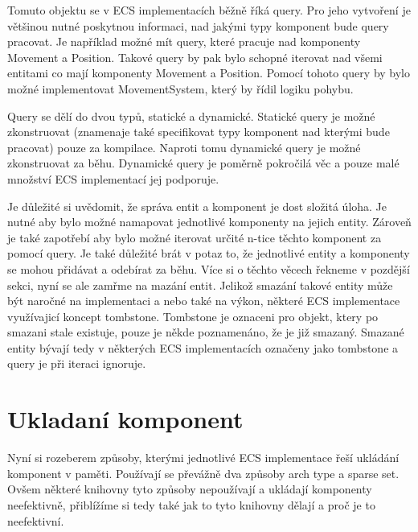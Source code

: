 Tomuto objektu se v ECS implementacích běžně říká query. Pro jeho vytvoření je většinou nutné poskytnou informaci, nad jakými typy komponent bude query pracovat. Je například možné mít query, které pracuje nad komponenty Movement a Position. Takové query by pak bylo schopné iterovat nad všemi entitami co mají komponenty Movement a Position. Pomocí tohoto query by bylo možné implementovat MovementSystem, který by řídil logiku pohybu.

Query se dělí do dvou typů, statické a dynamické. Statické query je možné zkonstruovat (znamenaje také specifikovat typy komponent nad kterými bude pracovat) pouze za kompilace. Naproti tomu dynamické query je možné zkonstruovat za běhu. Dynamické query je poměrně pokročilá věc a pouze malé množství ECS implementací jej podporuje.

Je důležité si uvědomit, že správa entit a komponent je dost složitá úloha. Je nutné aby bylo možné namapovat jednotlivé komponenty na jejich entity. Zároveň je také zapotřebí aby bylo možné iterovat určité n-tice těchto komponent za pomocí query. Je také důležité brát v potaz to, že jednotlivé entity a komponenty se mohou přidávat a odebírat za běhu. Více si o těchto věcech řekneme v pozdější sekci, nyní se ale zamřme na mazání entit. Jelikož smazání takové entity může být naročné na implementaci a nebo také na výkon, některé ECS implementace využívajicí koncept tombstone. Tombstone je oznaceni pro objekt, ktery po smazani stale existuje, pouze je někde poznamenáno, že je již smazaný. Smazané entity bývají tedy v některých ECS implementacích označeny jako tombstone a query je při iteraci ignoruje.





\section{Ukladaní komponent}
Nyní si rozeberem způsoby, kterými jednotlivé ECS implementace řeší ukládání komponent v paměti. Používají se převážně dva způsoby arch type a sparse set. Ovšem některé knihovny tyto způsoby nepoužívají a ukládají komponenty neefektivně, přiblížíme si tedy také jak to tyto knihovny dělají a proč je to neefektivní.

